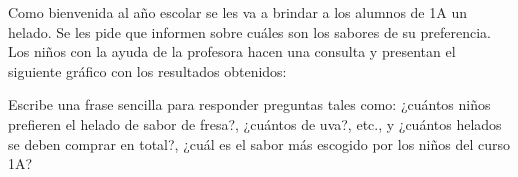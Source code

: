 \ejemplo

Como bienvenida al año escolar se les va a brindar a los alumnos de 1A un helado. Se les pide que informen sobre cuáles son los sabores de su preferencia. Los niños con la ayuda de la profesora hacen una consulta y presentan el siguiente gráfico con los resultados obtenidos:


Escribe una frase sencilla para responder preguntas tales como: ¿cuántos niños prefieren el helado de sabor de fresa?, ¿cuántos de uva?, etc., y ¿cuántos helados se deben comprar en total?, ¿cuál es el sabor más escogido por los niños del curso 1A?

